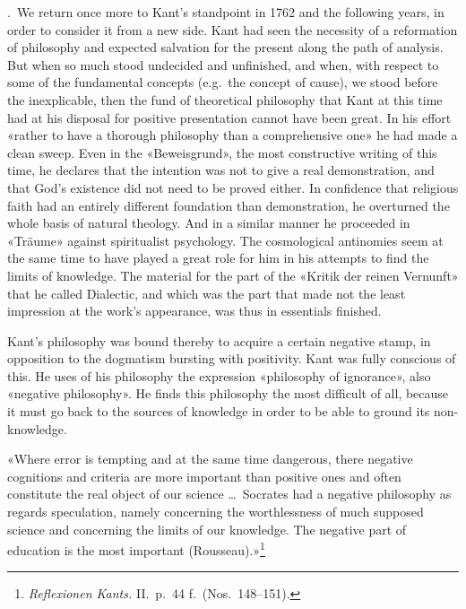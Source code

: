 \documentclass[12pt,a4paper]{article}
\newcommand{\opage}[1]{\marginnote{\footnotesize\textit{[#1]}}}
\begin{document}
.\ We return once more to Kant's standpoint in 1762 and the
following years, in order to consider it from a new side. Kant had seen the
necessity of a reformation of philosophy and expected salvation for the
present along the path of analysis. But when so much stood undecided and
unfinished, and when, with respect to some of the fundamental concepts
(e.g.\ the concept of cause), we stood before the inexplicable, then the
fund of theoretical philosophy that Kant at this time had at his disposal
for positive presentation cannot have been great. In his effort «rather to
have a thorough philosophy than a comprehensive one» he had made a clean
sweep. Even in the «Beweisgrund», the most constructive writing of this
time, he declares that the intention was not to give a real demonstration,
and that God's existence did not need to be proved either. In confidence
that religious faith had an entirely different foundation than
demonstration, he overturned the whole basis of natural theology. And in a
similar manner he proceeded in «Träume» against spiritualist psychology.
The cosmological antinomies seem at the same time to have played a great
role for him in his attempts to find the limits of knowledge. The material
for the part of the «Kritik der reinen Vernunft» that he called Dialectic,
and which was the part that made not the least impression at the work's
appearance, was thus in essentials finished.

Kant's philosophy was bound thereby to acquire a certain negative stamp, in
opposition to the dogmatism bursting with positivity. Kant was fully
conscious of this. He uses of his philosophy the expression «philosophy of
ignorance», also «negative philosophy». He finds this philosophy the most
difficult of all, because it must go back to the sources of knowledge in
order to be able to ground its non-knowledge.

«Where error is tempting and at the same time dangerous, there negative
cognitions and criteria are more important than positive ones and often
constitute the real object of our science \ldots\ Socrates \opage{36}had a negative
philosophy as regards speculation, namely concerning the worthlessness of
much supposed science and concerning the limits of our knowledge. The
negative part of education is the most important
(Rousseau).»\footnote{\textit{Reflexionen Kants.} II.\ p.\ 44 f.\ (Nos.\
148--151).}
\end{document}
